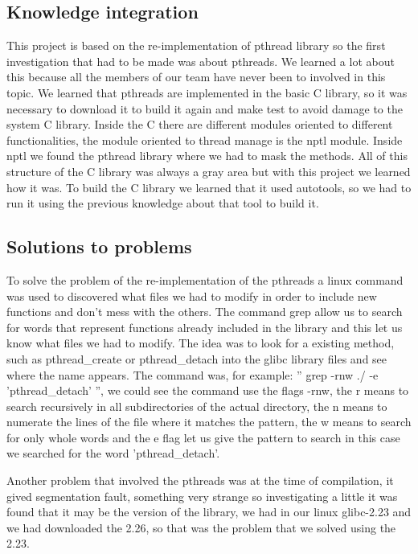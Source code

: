 \documentclass[a4paper,9pt]{article}
\begin{document}
\subsection{Knowledge integration}

This project is based on the re-implementation of pthread library so the first investigation that had to be made was about 
pthreads. We learned a lot about this because all the members of our team have never been to involved in this topic. We learned that pthreads are implemented in the basic C library, so it was necessary to download it to build it again and make test to avoid damage to
the system C library. Inside the C there are different modules oriented to different functionalities, the module oriented to 
thread manage is the nptl module. Inside nptl we found the pthread library where we had to mask the methods. All of this structure 
of the C library was always a gray area but with this project we learned how it was. To build the C library we learned that it used autotools, so we had to run it using the previous knowledge about that tool to build it.



\subsection{Solutions to problems}

To solve the problem of the re-implementation of the pthreads a linux command was used to discovered what files we had to modify
in order to include new functions and don't mess with the others. The command grep allow us to search for words that represent
functions already included in the library and this let us know what files we had to modify. The idea was to look for a existing method, such as pthread\_create or pthread\_detach into the glibc library files and see where the name appears. The command was, for example: ” grep -rnw ./ -e 'pthread\_detach' ”, we could see the command use the flags -rnw, the r means to search recursively in all subdirectories of the 
actual directory, the n means to numerate the lines of the file where it matches the pattern, the w means to search for only whole words and the e flag let us give the pattern to search in this case we searched for the word 'pthread\_detach'.  

Another problem that involved the pthreads was at the time of compilation, it gived segmentation fault, something very strange so investigating a little it was found that it may be the version of the library, we had in our linux glibc-2.23 and we had downloaded the 2.26, so that was the problem that we solved using the 2.23. 
\end{document}
